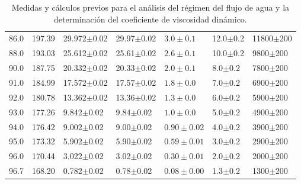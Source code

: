 \begin{table}[H]
\begin{minipage}{\textwidth}
\begin{tabular}{C{1cm}|C{1cm}| C{2.5cm}|C{2cm}| C{1.8cm}|C{2.2cm}|C{2cm}}
		86.0 & 197.39 & 29.972$\pm$0.02 & 29.97$\pm$0.02 & $3.0 \pm 0.1$  &   12.0$\pm$0.2 &   11800$\pm$200 \\
		88.0 & 193.03 & 25.612$\pm$0.02 & 25.61$\pm$0.02 & $2.6 \pm 0.1$  &   10.0$\pm$0.2 &    9800$\pm$200 \\
		90.0 & 187.75 & 20.332$\pm$0.02 & 20.33$\pm$0.02 & $2.0 \pm 0.1$  &    8.0$\pm$0.2 &    7800$\pm$200 \\
		91.0 & 184.99 & 17.572$\pm$0.02 & 17.57$\pm$0.02 & $1.8 \pm 0.0$  &    7.0$\pm$0.2 &    6900$\pm$200 \\
		92.0 & 180.78 & 13.362$\pm$0.02 & 13.36$\pm$0.02 & $1.3 \pm 0.0$  &    6.0$\pm$0.2 &    5900$\pm$200 \\
		93.0 & 177.26 &  9.842$\pm$0.02 &  9.84$\pm$0.02 & $1.0 \pm 0.0$  &    5.0$\pm$0.2 &    4900$\pm$200 \\
		94.0 & 176.42 &  9.002$\pm$0.02 &  9.00$\pm$0.02 & $0.90\pm 0.02$ &  4.0$\pm$0.2&       3900$\pm$200 \\
		95.0 & 173.32 &  5.902$\pm$0.02 &  5.90$\pm$0.02 & $0.59\pm 0.01$ &3.0$\pm$0.2  &       2900$\pm$200 \\
		96.0 & 170.44 &  3.022$\pm$0.02 &  3.02$\pm$0.02 & $0.30\pm 0.01$ &2.0$\pm$0.2  &       2000$\pm$200 \\
		96.7 & 168.20 &  0.782$\pm$0.02 &  0.78$\pm$0.02 & $0.08\pm 0.00$ &1.3$\pm$0.2  &       1300$\pm$200 \\
		\bottomrule
		\bottomrule		
	\end{tabular}
	\caption{ \small Medidas y cálculos previos para el análisis del régimen del flujo de agua y  la determinación del coeficiente de viscosidad dinámico.}
	\label{tab:medidas_1}
	\end{minipage}
\end{table}

